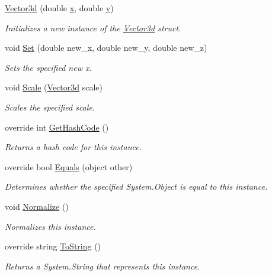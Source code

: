 \begin{DoxyCompactItemize}
\hyperlink{struct_unity_engine_1_1_vector3d_a02d3241c9b857c4647e0c634dc602c1a}{Vector3d} (double \hyperlink{struct_unity_engine_1_1_vector3d_ab84cc8ded7be8d479f6c04351e604e44}{x}, double \hyperlink{struct_unity_engine_1_1_vector3d_a03113ffc1771dfcd797c8a626149e1f1}{y})
\begin{DoxyCompactList}\small\item\em Initializes a new instance of the \hyperlink{struct_unity_engine_1_1_vector3d}{Vector3d} struct. \end{DoxyCompactList}\item 
void \hyperlink{struct_unity_engine_1_1_vector3d_a21b1dc44b2ccc63821c1ac1f7467f0cd}{Set} (double new\+\_\+x, double new\+\_\+y, double new\+\_\+z)
\begin{DoxyCompactList}\small\item\em Sets the specified new x. \end{DoxyCompactList}\item 
void \hyperlink{struct_unity_engine_1_1_vector3d_ad22192035a213ca8022dfc98c1412041}{Scale} (\hyperlink{struct_unity_engine_1_1_vector3d}{Vector3d} scale)
\begin{DoxyCompactList}\small\item\em Scales the specified scale. \end{DoxyCompactList}\item 
override int \hyperlink{struct_unity_engine_1_1_vector3d_acb727809084d322580684c8eb24acab7}{Get\+Hash\+Code} ()
\begin{DoxyCompactList}\small\item\em Returns a hash code for this instance. \end{DoxyCompactList}\item 
override bool \hyperlink{struct_unity_engine_1_1_vector3d_abfd4ffa4f51c5b6713f7f833ae8b85a2}{Equals} (object other)
\begin{DoxyCompactList}\small\item\em Determines whether the specified System.\+Object is equal to this instance. \end{DoxyCompactList}\item 
void \hyperlink{struct_unity_engine_1_1_vector3d_a84aec1e9e703eb3286028ed518af4c71}{Normalize} ()
\begin{DoxyCompactList}\small\item\em Normalizes this instance. \end{DoxyCompactList}\item 
override string \hyperlink{struct_unity_engine_1_1_vector3d_a92880ca24fc30ca5fbfc04a93a99d837}{To\+String} ()
\begin{DoxyCompactList}\small\item\em Returns a System.\+String that represents this instance. \end{DoxyCompactList}\end{DoxyCompactItemize}
